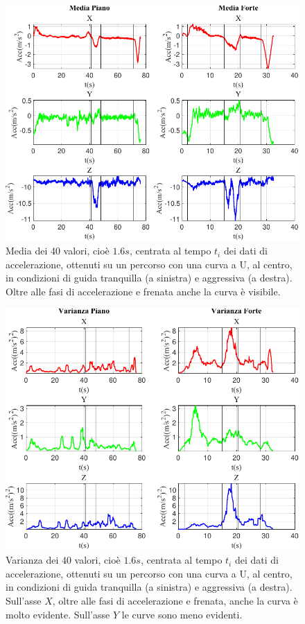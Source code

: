 \documentclass[class=article]{standalone}
\begin{document}
	\begin{center}
		\begin{figure}[h!]
			\centering\includegraphics[width=.7\textwidth]{img/CurvaUFP/Acc/Media}
			\caption[]{Media dei 40 valori, cioè \(1.6s\), centrata al tempo \(t_{i}\) dei dati di accelerazione, ottenuti su un percorso con una curva a U, al centro, in condizioni di guida tranquilla (a sinistra) e aggressiva (a destra). Oltre alle fasi di accelerazione e frenata anche la curva è visibile.}
			\label{fig:AccMedia_CurvaUFP}
		\end{figure}
	\end{center}
	
	\begin{center}
		\begin{figure}[h!]
			\centering\includegraphics[width=.7\textwidth]{img/curvaUFP/Acc/Varianza}
			\caption[]{Varianza dei 40 valori, cioè \(1.6s\), centrata al tempo \(t_{i}\) dei dati di accelerazione, ottenuti su un percorso con una curva a U, al centro, in condizioni di guida tranquilla (a sinistra) e aggressiva (a destra). Sull'asse \(X\), oltre alle fasi di accelerazione e frenata, anche la curva è molto evidente. Sull'asse \(Y\) le curve sono meno evidenti.}
			\label{fig:AccVar_curvaUFP}
		\end{figure}
	\end{center}
	
\end{document}
